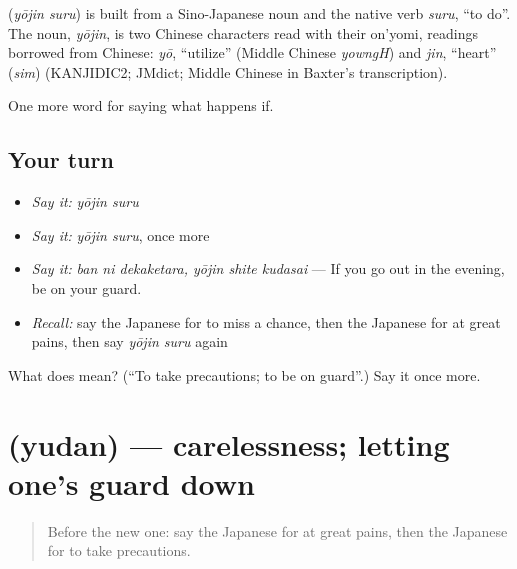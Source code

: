 \begin{cousinweb}
\textbf{} (\emph{yōjin suru}) is built from a Sino-Japanese noun and the native verb \emph{suru}, \textquotedblleft{}to do\textquotedblright{}. The noun, \emph{yōjin}, is two Chinese characters read with their on'yomi, readings borrowed from Chinese: \emph{yō}, \textquotedblleft{}utilize\textquotedblright{} (Middle Chinese \emph{yowngH}) and \emph{jin}, \textquotedblleft{}heart\textquotedblright{} (\emph{sim}) (KANJIDIC2; JMdict; Middle Chinese in Baxter's transcription).
\end{cousinweb}

\begin{grammarlens}[title={What you've built}]
One more word for saying what happens if.
\end{grammarlens}

\subsection*{Your turn}
\begin{itemize}
\raggedright
  \item \emph{Say it:} \emph{yōjin suru}
  \item \emph{Say it:} \emph{yōjin suru}, once more
  \item \emph{Say it:} \emph{ban ni dekaketara, yōjin shite kudasai} — If you go out in the evening, be on your guard.
  \item \emph{Recall:} say the Japanese for to miss a chance, then the Japanese for at great pains, then say \emph{yōjin suru} again
\end{itemize}

\begin{tcolorbox}[breakable,colback=teal!4,colframe=teal!35!black,title={Before you move on}]
What does  mean? (\textquotedblleft{}To take precautions; to be on guard\textquotedblright{}.) Say it once more.
\end{tcolorbox}
\section[\texorpdfstring{\ja{ゆだん} (yudan)}{ゆだん (yudan)}]{ (yudan) — carelessness; letting one's guard down}

\label{lesson:JA-C350-yudan}



\begin{quote}
Before the new one: say the Japanese for at great pains, then the Japanese for to take precautions.
\end{quote}

